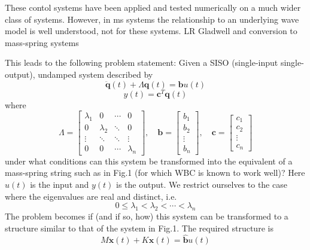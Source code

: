 \documentclass{mbd_fullpaper}
\begin{document}
These contol systems have been applied and tested numerically on a much wider class of systems.
However, in ms systems the relationship to an underlying wave model is well understood, not for these systems.
LR Gladwell and conversion to mass-spring systems

This leads to the following problem statement:
Given a SISO (single-input single-output), undamped system described by
\begin{equation}
\ddot{\mathbf{q}}(t) + \Lambda\mathbf{q}(t) = \mathbf{b}u(t)
\label{eq:modal1}
\end{equation}
\begin{equation}
y(t) = \mathbf{c}^T \mathbf{q}(t)
\label{eq:modal2}
\end{equation}
where
\begin{equation}
\Lambda = \begin{bmatrix}
\lambda_1  &  0 & \cdots & 0 \\
0 & \lambda_2  & \ddots & 0 \\
\vdots & \ddots & \ddots & \vdots \\
0 & 0 & \cdots & \lambda_n \end{bmatrix}
,\quad \mathbf{b} = \begin{bmatrix} b_1 \\ b_2 \\ \vdots \\ b_n \end{bmatrix}
,\quad \mathbf{c} = \begin{bmatrix} c_1 \\ c_2 \\ \vdots \\ c_n \end{bmatrix}
\end{equation}
under what conditions can this system be transformed into the equivalent of a mass-spring string such as in Fig.1 (for which WBC is known to work well)?
Here $u(t)$ is the input and $y(t)$ is the output.
We restrict ourselves to the case where the eigenvalues are real and distinct, i.e.
\begin{equation}
0 \leq \lambda_1<\lambda_2< \cdots <\lambda_n
\label{eq:lambda}
\end{equation}
The problem becomes if (and if so, how) this system can be transformed to a structure similar to that of the system in Fig.1.
The required structure is
\begin{equation}
M\ddot{\mathbf{x}}(t) + K\mathbf{x}(t) = \mathbf{\hat{b}}u(t)
\label{eq:eom1}
\end{equation}
\end{document}
